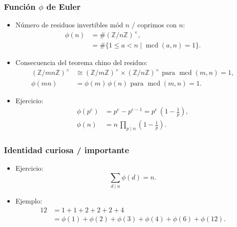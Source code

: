 \documentclass[handout]{beamer}
\newcommand{\ZZ}{\mathbb{Z}}
\DeclareMathOperator{\mcd}{mcd}
\begin{document}

\begin{frame}
  \frametitle{Función $\phi$ de Euler}

  \begin{itemize}
  \item<2-> Número de residuos invertibles mód $n$ / coprimos con $n$:
    \begin{align*}
      \phi (n) & = \# (\ZZ/n\ZZ)^\times, \\
               & = \# \{ 1 \le a < n \mid \mcd (a,n) = 1 \}.
    \end{align*}

  \item<3-> Consecuencia del teorema chino del residuo:
    \begin{align*}
      (\ZZ/mn\ZZ)^\times & \cong (\ZZ/m\ZZ)^\times \times (\ZZ/n\ZZ)^\times \text{ para }\mcd(m,n) = 1,\\
      \phi (mn) & = \phi (m)\,\phi(n) \text{ para }\mcd(m,n) = 1.
    \end{align*}

  \item<4-> Ejercicio:
    \begin{align*}
      \phi (p^e) & = p^e - p^{e-1} = p^e\,\left(1 - \frac{1}{p}\right), \\
      \phi (n) & = n\,\prod_{p \mid n} \left(1 - \frac{1}{p}\right).
    \end{align*}
  \end{itemize}
\end{frame}

\begin{frame}
  \frametitle{Identidad curiosa / importante}

  \begin{itemize}
  \item<2-> Ejercicio:
    \[ \sum_{d\mid n} \phi (d) = n. \]

  \item<3-> Ejemplo:
    \begin{align*}
      12 & = 1 + 1 + 2 + 2 + 2 + 4 \\
         & = \phi (1) + \phi (2) + \phi (3) + \phi (4) + \phi (6) + \phi (12).
    \end{align*}
  \end{itemize}
\end{frame}

\end{document}
